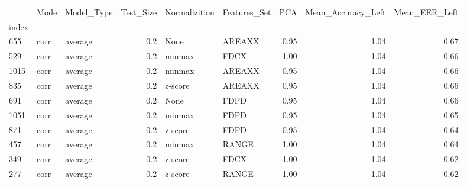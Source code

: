 \begin{tabular}{lllrllrrr}
\toprule
{} &  Mode & Model\_Type &  Test\_Size & Normalizition & Features\_Set &   PCA &  Mean\_Accuracy\_Left &  Mean\_EER\_Left \\
index &       &            &            &               &              &       &                     &                \\
\midrule
655   &  corr &    average &        0.2 &          None &       AREAXX &  0.95 &                1.04 &           0.67 \\
529   &  corr &    average &        0.2 &        minmax &         FDCX &  1.00 &                1.04 &           0.66 \\
1015  &  corr &    average &        0.2 &        minmax &       AREAXX &  0.95 &                1.04 &           0.66 \\
835   &  corr &    average &        0.2 &       z-score &       AREAXX &  0.95 &                1.04 &           0.66 \\
691   &  corr &    average &        0.2 &          None &         FDPD &  0.95 &                1.04 &           0.66 \\
1051  &  corr &    average &        0.2 &        minmax &         FDPD &  0.95 &                1.04 &           0.65 \\
871   &  corr &    average &        0.2 &       z-score &         FDPD &  0.95 &                1.04 &           0.64 \\
457   &  corr &    average &        0.2 &        minmax &        RANGE &  1.00 &                1.04 &           0.64 \\
349   &  corr &    average &        0.2 &       z-score &         FDCX &  1.00 &                1.04 &           0.62 \\
277   &  corr &    average &        0.2 &       z-score &        RANGE &  1.00 &                1.04 &           0.62 \\
\bottomrule
\end{tabular}
